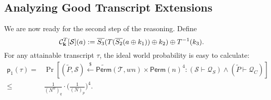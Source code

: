 

\subsection{Analyzing Good Transcript Extensions}
\label{sec:good-tau-4-rounds}

We are now ready for the second step of the reasoning. Define
%
$$\mathcal{C}_{\mathbf{k}}^T[\mathcal{S}](a):=   \overline{S_3}(T(\overline{S_2}(a\oplus k_1))\oplus k_2)\oplus T^{-1}(k_3).$$
%
For any attainable transcript $\tau$, the ideal world probability is easy to calculate:
%
%
\begin{align*}
\mathsf{p}_{1}(\tau)=&\operatorname{Pr}\left[(\widetilde{P},\mathcal{S})\stackrel{\$}{\leftarrow} \widetilde{{\mathsf{Perm}}}(\mathcal{T}, w n)\times\mathsf{Perm}(n)^4: (\mathcal{S} \vdash \mathcal{Q}_{S}) \wedge(\widetilde{P} \vdash \mathcal{Q}_{C})  \right]		\\
\leq&\frac{1}{(N^w)_q}\cdot\bigg(\frac{1}{(N)_p}\bigg)^4.
\end{align*}



